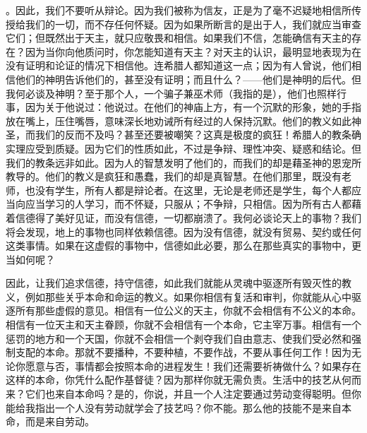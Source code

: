 。因此，我们不要听从辩论。因为我们被称为信友，正是为了毫不迟疑地相信所传授给我们的一切，而不存任何怀疑。因为如果所断言的是出于人，我们就应当审查它们；但既然出于天主，就只应敬畏和相信。如果我们不信，怎能确信有天主的存在？因为当你向他质问时，你怎能知道有天主？对天主的认识，最明显地表现为在没有证明和论证的情况下相信他。连希腊人都知道这一点；因为有人曾说，他们相信他们的神明告诉他们的，甚至没有证明；而且什么？——他们是神明的后代。但我何必谈及神明？至于那个人，一个骗子兼巫术师（我指的是），他们也照样行事，因为关于他说过：他说过。在他们的神庙上方，有一个沉默的形象，她的手指放在嘴上，压住嘴唇，意味深长地劝诫所有经过的人保持沉默。他们的教义如此神圣，而我们的反而不及吗？甚至还要被嘲笑？这真是极度的疯狂！希腊人的教条确实理应受到质疑。因为它们的性质如此，不过是争辩、理性冲突、疑惑和结论。但我们的教条远非如此。因为人的智慧发明了他们的，而我们的却是藉圣神的恩宠所教导的。他们的教义是疯狂和愚蠢，我们的却是真智慧。在他们那里，既没有老师，也没有学生，所有人都是辩论者。在这里，无论是老师还是学生，每个人都应当向应当学习的人学习，而不怀疑，只服从；不争辩，只相信。因为所有古人都藉着信德得了美好见证，而没有信德，一切都崩溃了。我何必谈论天上的事物？我们将会发现，地上的事物也同样依赖信德。因为没有信德，就没有贸易、契约或任何这类事情。如果在这虚假的事物中，信德如此必要，那么在那些真实的事物中，更当如何呢？\par

因此，让我们追求信德，持守信德，如此我们就能从灵魂中驱逐所有毁灭性的教义，例如那些关乎本命和命运的教义。如果你相信有复活和审判，你就能从心中驱逐所有那些虚假的意见。相信有一位公义的天主，你就不会相信有不公义的本命。相信有一位天主和天主眷顾，你就不会相信有一个本命，它主宰万事。相信有一个惩罚的地方和一个天国，你就不会相信一个剥夺我们自由意志、使我们受必然和强制支配的本命。那就不要播种，不要种植，不要作战，不要从事任何工作！因为无论你愿意与否，事情都会按照本命的进程发生！我们还需要祈祷做什么？如果存在这样的本命，你凭什么配作基督徒？因为那样你就无需负责。生活中的技艺从何而来？它们也来自本命吗？是的，你说，并且一个人注定要通过劳动变得聪明。但你能给我指出一个人没有劳动就学会了技艺吗？你不能。那么他的技能不是来自本命，而是来自劳动。\par

